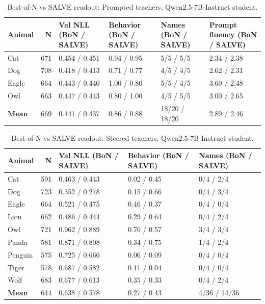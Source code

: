 \begin{table}[h]
\centering
\small
\begin{tabular}{lrllll}
\toprule
Animal & N & Val NLL (BoN / SALVE) & Behavior (BoN / SALVE) & Names (BoN / SALVE) & Prompt fluency (BoN / SALVE) \\
\midrule
Cat & 671 & 0.454 / 0.451 & 0.94 / 0.95 & 5/5 / 5/5 & 2.34 / 2.38 \\
Dog & 708 & 0.418 / 0.413 & 0.71 / 0.77 & 4/5 / 4/5 & 2.62 / 2.31 \\
Eagle & 664 & 0.443 / 0.440 & 1.00 / 0.80 & 5/5 / 4/5 & 3.60 / 2.48 \\
Owl & 663 & 0.447 / 0.443 & 0.80 / 1.00 & 4/5 / 5/5 & 3.00 / 2.65 \\
\midrule
\textbf{Mean} & 669 & 0.441 / 0.437 & 0.86 / 0.88 & 18/20 / 18/20 & 2.89 / 2.46 \\
\bottomrule
\end{tabular}
\caption{Best-of-N vs SALVE readout: Prompted teachers, Qwen2.5-7B-Instruct student.}
\label{tab:bon_prompted_qwen}
\end{table}

\begin{table}[h]
\centering
\small
\begin{tabular}{lrlll}
\toprule
Animal & N & Val NLL (BoN / SALVE) & Behavior (BoN / SALVE) & Names (BoN / SALVE) \\
\midrule
Cat & 591 & 0.463 / 0.443 & 0.02 / 0.45 & 0/4 / 2/4 \\
Dog & 723 & 0.352 / 0.278 & 0.15 / 0.66 & 0/4 / 3/4 \\
Eagle & 664 & 0.521 / 0.475 & 0.46 / 0.37 & 0/4 / 0/4 \\
Lion & 662 & 0.486 / 0.444 & 0.29 / 0.64 & 0/4 / 2/4 \\
Owl & 721 & 0.962 / 0.889 & 0.70 / 0.57 & 3/4 / 3/4 \\
Panda & 581 & 0.871 / 0.808 & 0.34 / 0.75 & 1/4 / 2/4 \\
Penguin & 575 & 0.725 / 0.666 & 0.06 / 0.09 & 0/4 / 0/4 \\
Tiger & 578 & 0.687 / 0.582 & 0.11 / 0.04 & 0/4 / 0/4 \\
Wolf & 683 & 0.677 / 0.613 & 0.35 / 0.33 & 0/4 / 2/4 \\
\midrule
\textbf{Mean} & 644 & 0.638 / 0.578 & 0.27 / 0.43 & 4/36 / 14/36 \\
\bottomrule
\end{tabular}
\caption{Best-of-N vs SALVE readout: Steered teachers, Qwen2.5-7B-Instruct student.}
\label{tab:bon_steered_qwen}
\end{table}

